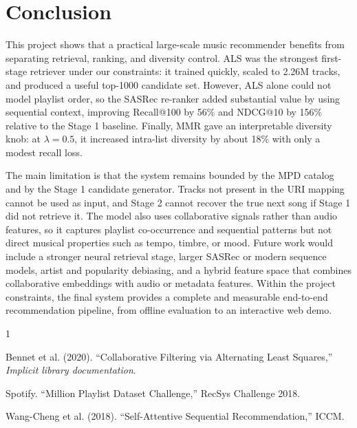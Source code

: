 \documentclass[11pt,a4paper]{article}
\begin{document}

\section{Conclusion}

This project shows that a practical large-scale music recommender benefits from
separating retrieval, ranking, and diversity control. ALS was the strongest
first-stage retriever under our constraints: it trained quickly, scaled to 2.26M
tracks, and produced a useful top-1000 candidate set. However, ALS alone could
not model playlist order, so the SASRec re-ranker added substantial value by
using sequential context, improving Recall@100 by 56\% and NDCG@10 by 156\%
relative to the Stage 1 baseline. Finally, MMR gave an interpretable diversity
knob: at $\lambda=0.5$, it increased intra-list diversity by about 18\% with
only a modest recall loss.

The main limitation is that the system remains bounded by the MPD catalog and
by the Stage 1 candidate generator. Tracks not present in the URI mapping cannot
be used as input, and Stage 2 cannot recover the true next song if Stage 1 did
not retrieve it. The model also uses collaborative signals rather than audio
features, so it captures playlist co-occurrence and sequential patterns but not
direct musical properties such as tempo, timbre, or mood. Future work would
include a stronger neural retrieval stage, larger SASRec or modern sequence
models, artist and popularity debiasing, and a hybrid feature space that
combines collaborative embeddings with audio or metadata features. Within the
project constraints, the final system provides a complete and measurable
end-to-end recommendation pipeline, from offline evaluation to an interactive
web demo.

\begin{thebibliography}{1}

 Bennet et al. (2020). ``Collaborative Filtering via Alternating Least Squares,'' \textit{Implicit library documentation}.

 Spotify. ``Million Playlist Dataset Challenge,'' RecSys Challenge 2018.

 Wang-Cheng et al. (2018). ``Self-Attentive Sequential Recommendation,'' ICCM.

\end{thebibliography}
\end{document}
